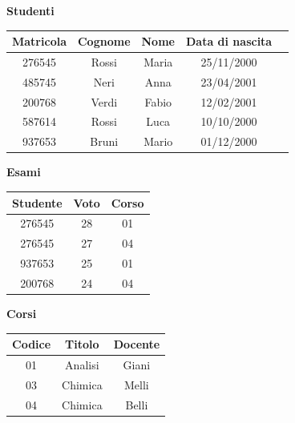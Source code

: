\documentclass[12pt]{report}
\begin{document}
	\begin{center}

		\textbf{Studenti}

		\vspace{0.5cm}

		\begin{tabular}{|c|c|c|c|c|}
			\hline
			\textbf{Matricola} & \textbf{Cognome} & \textbf{Nome} & \textbf{Data di nascita} \\
			\hline
			276545 & Rossi & Maria & 25/11/2000 \\
			485745 & Neri & Anna & 23/04/2001 \\
			200768 & Verdi & Fabio & 12/02/2001 \\
			587614 & Rossi & Luca & 10/10/2000 \\
			937653 & Bruni & Mario & 01/12/2000 \\
			\hline
		\end{tabular}

		\vspace{1.5cm}

		\begin{minipage}[t]{0.45\textwidth}
			\centering
			\textbf{Esami}

			\vspace{0.5cm}

			\begin{tabular}{|c|c|c|}
				\hline
				\textbf{Studente} & \textbf{Voto} & \textbf{Corso} \\
				\hline
				276545 & 28 & 01 \\
				276545 & 27 & 04 \\
				937653 & 25 & 01 \\
				200768 & 24 & 04 \\
				\hline
			\end{tabular}
		\end{minipage}
		\hfill
		\begin{minipage}[t]{0.45\textwidth}
			\centering
			\textbf{Corsi}

			\vspace{0.5cm}

			\begin{tabular}{|c|c|c|}
				\hline
				\textbf{Codice} & \textbf{Titolo} & \textbf{Docente} \\
				\hline
				01 & Analisi & Giani \\
				03 & Chimica & Melli \\
				04 & Chimica & Belli \\
				\hline
			\end{tabular}
		\end{minipage}

	\end{center}
\end{document}
